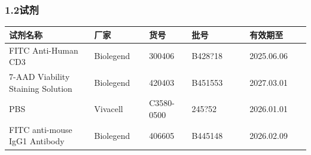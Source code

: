 \documentclass[UTF8,10pt,a4paper,fontset=fandol]{ctexart}
\newcommand{\fieldvalue}[1]{#1}
\newcommand{\handwritten}[1]{#1}
\begin{document}
\subsubsection{1.2\quad 试剂}

\begin{tabular}{|p{0.29\linewidth}|p{0.18\linewidth}|p{0.14\linewidth}|p{0.19\linewidth}|p{0.20\linewidth}|}
\hline
试剂名称 & 厂家 & 货号 & 批号 & 有效期至 \\
\hline
FITC Anti-Human CD3 &
\fieldvalue{Biolegend} &
\fieldvalue{300406} &
\fieldvalue{\handwritten{B428?18}} &
\fieldvalue{\handwritten{2025.06.06}}
\\
\hline
7-AAD Viability Staining Solution &
\fieldvalue{Biolegend} &
\fieldvalue{420403} &
\fieldvalue{\handwritten{B451553}} &
\fieldvalue{\handwritten{2027.03.01}}
\\
\hline
PBS &
\fieldvalue{Vivacell} &
\fieldvalue{C3580-0500} &
\fieldvalue{\handwritten{245?52}} &
\fieldvalue{\handwritten{2026.01.01}}
\\
\hline
FITC anti-mouse IgG1 Antibody &
\fieldvalue{Biolegend} &
\fieldvalue{406605} &
\fieldvalue{\handwritten{B445148}} &
\fieldvalue{\handwritten{2026.02.09}}
\\
\hline
\end{tabular}
\end{document}
